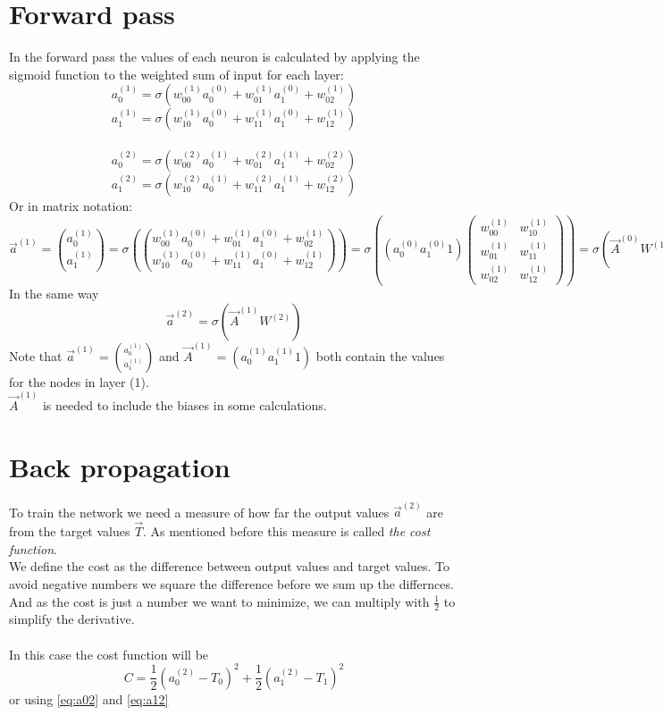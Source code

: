 \documentclass{article}
\begin{document}
\section*{Forward pass}
In the forward pass the values of each neuron is calculated by applying the sigmoid function to the weighted sum of input for each layer:
\\
\begin{equation} \label{eq:a01}
a_0^{(1)} = \sigma(w_{00}^{(1)}a_0^{(0)}+w_{01}^{(1)}a_1^{(0)}+w_{02}^{(1)})
\end{equation}
\begin{equation} \label{eq:a11}
a_1^{(1)} = \sigma(w_{10}^{(1)}a_0^{(0)}+w_{11}^{(1)}a_1^{(0)}+w_{12}^{(1)})
\end{equation}
\\
\begin{equation} \label{eq:a02}
a_0^{(2)} = \sigma(w_{00}^{(2)}a_0^{(1)}+w_{01}^{(2)}a_1^{(1)}+w_{02}^{(2)})
\end{equation}
\begin{equation} \label{eq:a12}
a_1^{(2)} = \sigma(w_{10}^{(2)}a_0^{(1)}+w_{11}^{(2)}a_1^{(1)}+w_{12}^{(2)})
\end{equation}
Or in matrix notation:
\[
\vec a^{(1)} =
\binom{a_0^{(1)}}{a_1^{(1)}} =
\sigma \left ( \binom{w_{00}^{(1)}a_0^{(0)}+w_{01}^{(1)}a_1^{(0)}+w_{02}^{(1)}}{w_{10}^{(1)}a_0^{(0)}+w_{11}^{(1)}a_1^{(0)}+w_{12}^{(1)}} \right )
= \sigma\left((a_0^{(0)} a_1^{(0)} 1)
\begin{pmatrix}
w_{00}^{(1)} & w_{10}^{(1)} \\
w_{01}^{(1)} & w_{11}^{(1)} \\
 w_{02}^{(1)} & w_{12}^{(1)}
\end{pmatrix}\right)
= \sigma(\vec A^{(0)}W^{(1)})
\]
In the same way
\[
\vec a^{(2)} = \sigma(\vec A^{(1)}W^{(2)})
\]
Note that $\vec a^{(1)} = \binom{a_0^{(1)}}{a_1^{(1)}}$ and $\vec A^{(1)} = (a_0^{(1)} a_1^{(1)} 1)$ both contain the values for the nodes in layer (1).
\\
$\vec A^{(1)}$ is needed to include the biases in some calculations.
\\
\section*{Back propagation}
To train the network we need a measure of how far the output values $\vec a^{(2)}$ are from the target values $\vec T$. As mentioned before this measure is called \textit{the cost function}.
\\
We define the cost as the difference between output values and target values. To avoid negative numbers we square the difference before we sum up the differnces.
\\
And as the cost is just a number we want to minimize, we can multiply with $\frac{1}{2}$ to simplify the derivative.
\\
\\
In this case the cost function will be $$ C = \frac {1}{2}(a_0^{(2)}-T_0)^2 + \frac {1}{2}(a_1^{(2)}-T_1)^2 $$
or using \eqref{eq:a02} and \eqref{eq:a12}
\end{document}
